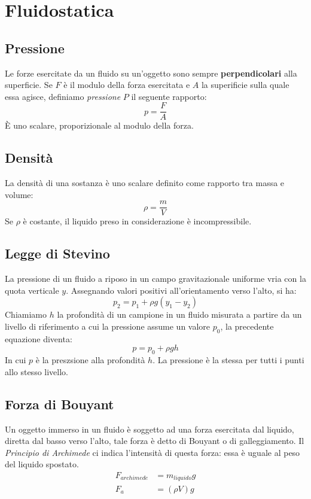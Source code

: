 \chapter{Fluidostatica}

    \section{Pressione} Le forze esercitate da un fluido su un'oggetto sono 
    sempre \textbf{perpendicolari} alla superficie. Se $F$ è il modulo della 
    forza esercitata e $A$ la superificie sulla quale essa agisce, definiamo
    \textit{pressione} $P$ il seguente rapporto:
        \begin{equation}
            p = \frac{F}{A}
        \end{equation}
    È uno scalare, proporizionale al modulo della forza.

    \section{Densità} La densità di una sostanza è uno scalare definito come 
    rapporto tra massa e volume:
        \begin{equation}
            \rho = \frac{m}{V}
        \end{equation}
    Se $\rho$ è costante, il liquido preso in considerazione è incompressibile.

    \section{Legge di Stevino} La pressione di un fluido a riposo in un campo
    gravitazionale uniforme vria con la quota verticale $y$. Assegnando valori
    positivi all'orientamento verso l'alto, si ha:
        \begin{equation*}
            p_2 = p_1 + \rho g(y_1-y_2)
        \end{equation*}
    Chiamiamo $h$ la profondità di un campione in un fluido misurata a partire
    da un livello di riferimento a cui la pressione assume un valore $p_0$, la 
    precedente equazione diventa:
        \begin{equation}
            p = p_0 + \rho gh
        \end{equation}
    In cui $p$ è la preszsione alla profondità $h$.
    La pressione è la stessa per tutti i punti allo stesso livello.

    \section{Forza di Bouyant} Un oggetto immerso in un fluido è soggetto ad 
    una forza esercitata dal liquido, diretta dal basso verso l'alto, tale 
    forza è detto di Bouyant o di galleggiamento.
    Il \textit{Principio di Archimede} ci indica l'intensità di questa forza:
    essa è uguale al peso del liquido spostato.
        \begin{align}
            F_{archimede} &= m_{liquido}g \\
            F_a &= (\rho V) g
        \end{align}

